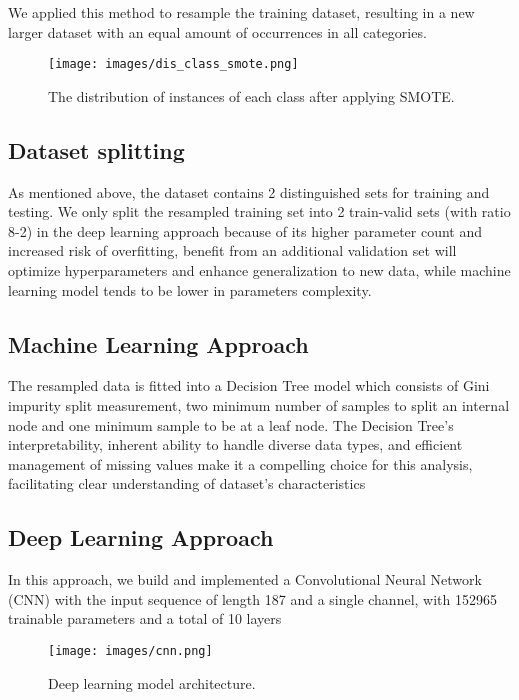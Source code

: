 \documentclass[]{acmsiggraph}
\begin{document}
We applied this method to resample the training dataset, resulting in a new larger dataset with an equal amount of occurrences in all categories.

\begin{figure}[h]\centering
 \texttt{[image: images/dis\_class\_smote.png]}
 \caption{\label{fig:reference}The distribution of instances of each class after applying SMOTE.}
\end{figure}

\subsection{Dataset splitting}
As mentioned above, the dataset contains 2 distinguished sets for training and testing. 
We only split the resampled training set into 2 train-valid sets (with ratio 8-2) in the deep learning approach because of its higher parameter count and increased risk of overfitting, benefit from an additional validation set will optimize hyperparameters and enhance generalization to new data, while machine learning model tends to be lower in parameters complexity.

\subsection{Machine Learning Approach}
The resampled data is fitted into a Decision Tree model which consists of Gini impurity split measurement, two minimum number of samples to split an internal node and one minimum sample to be at a leaf node. The Decision Tree's interpretability, inherent ability to handle diverse data types, and efficient management of missing values make it a compelling choice for this analysis, facilitating clear understanding of dataset's characteristics

\subsection{Deep Learning Approach}
In this approach, we build and implemented a Convolutional Neural Network (CNN) with the input sequence of length 187 and a single channel, with 152965 trainable parameters and a total of 10 layers

\begin{figure}[h]\centering
 \texttt{[image: images/cnn.png]}
 \caption{\label{fig:reference}Deep learning model architecture.}
\end{figure}
\end{document}
